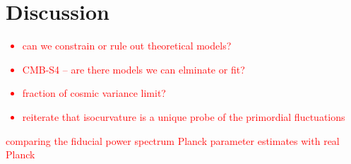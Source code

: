 \documentclass{emulateapj}
\newcommand\writingnote[1]{\textcolor{red}{#1}}
\begin{document}
\section{Discussion}\label{Discussion}
\writingnote{
  \begin{itemize}
    \item can we constrain or rule out theoretical models? 
    \item CMB-S4 -- are there models we can elminate or fit?
    \item fraction of cosmic variance limit?
    \item reiterate that isocurvature is a unique probe of the primordial fluctuations
  \end{itemize}
}

\appendix

\writingnote{comparing the fiducial power spectrum Planck parameter estimates with real Planck}


\end{document}
